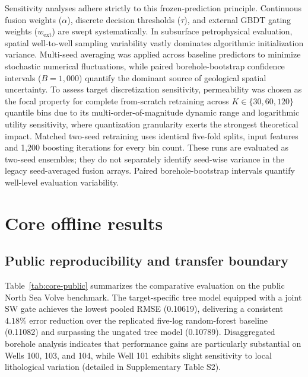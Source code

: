 \documentclass[preprint,12pt,nopreprintline]{elsarticle}
\begin{document}
Sensitivity analyses adhere strictly to this frozen-prediction principle. Continuous fusion weights ($\alpha$), discrete decision thresholds ($\tau$), and external GBDT gating weights ($w_{\mathrm{ext}}$) are swept systematically. In subsurface petrophysical evaluation, spatial well-to-well sampling variability vastly dominates algorithmic initialization variance. Multi-seed averaging was applied across baseline predictors to minimize stochastic numerical fluctuations, while paired borehole-bootstrap confidence intervals ($B=1,000$) quantify the dominant source of geological spatial uncertainty. To assess target discretization sensitivity, permeability was chosen as the focal property for complete from-scratch retraining across $K \in \{30, 60, 120\}$ quantile bins due to its multi-order-of-magnitude dynamic range and logarithmic utility sensitivity, where quantization granularity exerts the strongest theoretical impact. Matched two-seed retraining uses identical five-fold splits, input features and 1,200 boosting iterations for every bin count. These runs are evaluated as two-seed ensembles; they do not separately identify seed-wise variance in the legacy seed-averaged fusion arrays. Paired borehole-bootstrap intervals quantify well-level evaluation variability.

\section{Core offline results}
\label{sec:results}

\subsection{Public reproducibility and transfer boundary}
Table~\ref{tab:core-public} summarizes the comparative evaluation on the public North Sea Volve benchmark. The target-specific tree model equipped with a joint $\mathrm{SW}$ gate achieves the lowest pooled RMSE (0.10619), delivering a consistent $4.18\%$ error reduction over the replicated five-log random-forest baseline (0.11082) and surpassing the ungated tree model (0.10789). Disaggregated borehole analysis indicates that performance gains are particularly substantial on Wells 100, 103, and 104, while Well 101 exhibits slight sensitivity to local lithological variation (detailed in Supplementary Table S2).
\end{document}

